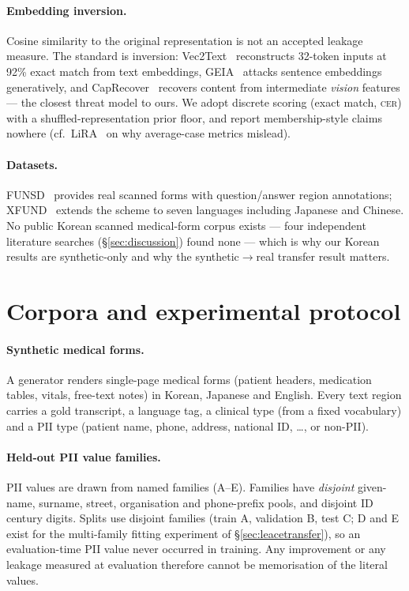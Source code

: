 \documentclass[11pt]{article}
\newcommand{\cer}{\textsc{cer}}
\begin{document}
\paragraph{Embedding inversion.} Cosine similarity to the original
representation is not an accepted leakage measure. The standard is
inversion: Vec2Text~\cite{morris2023vec2text} reconstructs 32-token inputs
at 92\% exact match from text embeddings, GEIA~\cite{gu2023geia} attacks
sentence embeddings generatively, and CapRecover~\cite{caprecover2025}
recovers content from intermediate \emph{vision} features --- the closest
threat model to ours. We adopt discrete scoring (exact match, \cer{}) with a
shuffled-representation prior floor, and report membership-style claims
nowhere (cf.\ LiRA~\cite{carlini2022membership} on why average-case metrics
mislead).

\paragraph{Datasets.} FUNSD~\cite{jaume2019funsd} provides real scanned
forms with question/answer region annotations; XFUND~\cite{xu2022xfund}
extends the scheme to seven languages including Japanese and Chinese. No
public Korean scanned medical-form corpus exists --- four independent
literature searches (\S\ref{sec:discussion}) found none --- which is why our
Korean results are synthetic-only and why the synthetic$\to$real transfer
result matters.

\section{Corpora and experimental protocol}\label{sec:corpora}

\paragraph{Synthetic medical forms.} A generator renders single-page medical
forms (patient headers, medication tables, vitals, free-text notes) in
Korean, Japanese and English. Every text region carries a gold transcript, a
language tag, a clinical type (from a fixed vocabulary) and a PII type
(patient name, phone, address, national ID, \dots, or non-PII).

\paragraph{Held-out PII value families.} PII values are drawn from named
families (A--E). Families have \emph{disjoint} given-name, surname, street,
organisation and phone-prefix pools, and disjoint ID century digits. Splits
use disjoint families (train A, validation B, test C; D and E exist for the
multi-family fitting experiment of \S\ref{sec:leacetransfer}), so an
evaluation-time PII value never occurred in training. Any improvement or any
leakage measured at evaluation therefore cannot be memorisation of the
literal values.
\end{document}
